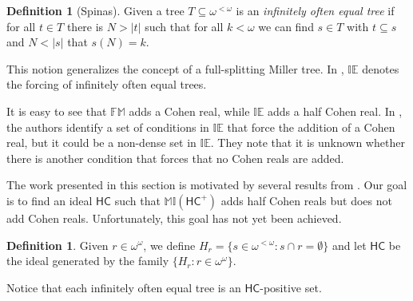 \documentclass{amsart}
\theoremstyle{definition}
\newtheorem{definition}[theorem]{Definition}
\theoremstyle{remark}
\numberwithin{equation}{section}
\newcommand{\hc}{\mathsf{HC}}
\newcommand{\mil}{\mathbb{MI}}
\begin{document}
\begin{definition}[Spinas]
    Given a tree $T\subseteq\omega^{<\omega}$  is an \emph{infinitely often equal tree} if for all $t\in T$ there is $N>|t|$ such that for all $k<\omega$ we can find $s\in T$ with $t\subseteq s$ and $N<|s|$ that $s(N)=k$.
\end{definition}

This notion generalizes the concept of a full-splitting Miller tree. In \cite{fullmil}, $\mathbb{IE}$ denotes the forcing of infinitely often equal trees.

It is easy to see that $\mathbb{FM}$ adds a Cohen real, while $\mathbb{IE}$ adds a half Cohen real. In \cite{fullmil}, the authors identify a set of conditions in $\mathbb{IE}$ that force the addition of a Cohen real, but it could be a non-dense set in $\mathbb{IE}$. They note that it is unknown whether there is another condition that forces that no Cohen reals are added.

The work presented in this section is motivated by several results from \cite{fullmil}. Our goal is to find an ideal $\hc$ such that $\mil(\hc^+)$ adds half Cohen reals but does not add Cohen reals. Unfortunately, this goal has not yet been achieved.

\begin{definition}
    Given $r\in \omega^\omega$, we define $H_r=\{s\in\omega^{<\omega}:s\cap r =\emptyset\}$ and let $\hc$ be the ideal generated by the family $\{H_r:r\in \omega^\omega\}$.
\end{definition}

Notice that each infinitely often equal tree is an $\hc$-positive set.
\end{document}
